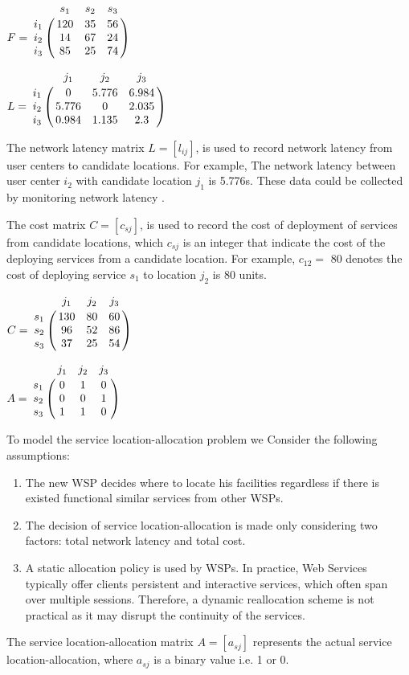 \documentclass{llncs}
\let\bbordermatrix\bordermatrix
\begin{document}
\parbox{.45\linewidth}{
{\centering
$
F = \bbordermatrix{~ & s_{1} & s_{2} & s_{3}  \cr
					i_{1}	&120 &35 &56	\cr
					i_{2}	&14  &67 &24 \cr
					i_{3}	&85 &25 &74 \cr}
$
\\}
}
\parbox{.45\linewidth}{
{\centering
$
L = \bbordermatrix{~ & j_{1} & j_{2} & j_{3} \cr
					i_{1}	&0 &5.776 &6.984	\cr
					i_{2}	&5.776  &0 &2.035 \cr
					i_{3}	&0.984 &1.135	&2.3 \cr}
$
\\}
}

The network latency matrix $L = [l_{ij}]$, is used to record network latency from user centers to 
candidate locations. For example, The network latency between user center $i_{2}$ with candidate location $j_{1}$ 
is 5.776s. These data could be collected by monitoring network latency \cite{6076756} \cite{5552800}.

The cost matrix $C = [c_{sj}]$, is used to record the cost of deployment of services from candidate locations, 
which $c_{sj}$ is an integer that indicate the cost of the deploying services from a candidate location. 
For example, $c_{12} = $ 80 denotes the cost of deploying service $s_{1}$ to location $j_{2}$ is 80 units.

\parbox{.45\linewidth}{
{\centering
$
C = \bbordermatrix{~ & j_{1} & j_{2} & j_{3}\cr
					s_{1}	&130 &80 &60\cr
					s_{2}	&96  &52 &86\cr
					s_{3}	&37 &25 &54\cr}
$
\\}
}
\parbox{.45\linewidth}{
{\centering
$
A = \bbordermatrix{~ & j_{1} & j_{2} & j_{3}\cr
					s_{1}	&0 &1 &0	\cr
					s_{2}	&0  &0 &1	\cr
					s_{3}	&1 &1 &0	\cr}
$
\\}
}

To model the service location-allocation problem we Consider the following assumptions:
\begin{enumerate}
	\item The new WSP decides where to locate his facilities regardless if there is existed functional similar services from other WSPs.
	\item The decision of service location-allocation is made only considering two factors: total network latency and total cost.
	\item A static allocation policy is used by WSPs. In practice, Web Services typically offer clients persistent and interactive services, which often span over multiple sessions. Therefore, a dynamic reallocation scheme is not practical as it may disrupt the continuity of the services.
\end{enumerate}


The service location-allocation matrix $A = [a_{sj}]$ represents the actual service location-allocation, where $a_{sj}$  is a binary value i.e. 1 or 0.
\end{document}
